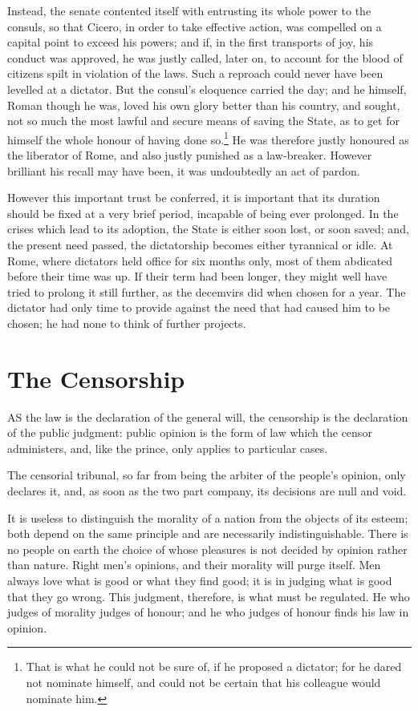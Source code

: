 \documentclass[12pt]{book}
\begin{document}
Instead, the senate contented itself with entrusting its whole power to the consuls, so that Cicero, in order to take effective action, was compelled on a capital point to exceed his powers; and if, in the first transports of joy, his conduct was approved, he was justly called, later on, to account for the blood of citizens spilt in violation of the laws. Such a reproach could never have been levelled at a dictator. But the consul's eloquence carried the day; and he himself, Roman though he was, loved his own glory better than his country, and sought, not so much the most lawful and secure means of saving the State, as to get for himself the whole honour of having done so.\footnote{That is what he could not be sure of, if he proposed a dictator; for he dared not nominate himself, and could not be certain that his colleague would nominate him.} He was therefore justly honoured as the liberator of Rome, and also justly punished as a law-breaker. However brilliant his recall may have been, it was undoubtedly an act of pardon.

However this important trust be conferred, it is important that its duration should be fixed at a very brief period, incapable of being ever prolonged. In the crises which lead to its adoption, the State is either soon lost, or soon saved; and, the present need passed, the dictatorship becomes either tyrannical or idle. At Rome, where dictators held office for six months only, most of them abdicated before their time was up. If their term had been longer, they might well have tried to prolong it still further, as the decemvirs did when chosen for a year. The dictator had only time to provide against the need that had caused him to be chosen; he had none to think of further projects.

\section{The Censorship}
AS the law is the declaration of the general will, the censorship is the declaration of the public judgment: public opinion is the form of law which the censor administers, and, like the prince, only applies to particular cases.

The censorial tribunal, so far from being the arbiter of the people's opinion, only declares it, and, as soon as the two part company, its decisions are null and void.

It is useless to distinguish the morality of a nation from the objects of its esteem; both depend on the same principle and are necessarily indistinguishable. There is no people on earth the choice of whose pleasures is not decided by opinion rather than nature. Right men's opinions, and their morality will purge itself. Men always love what is good or what they find good; it is in judging what is good that they go wrong. This judgment, therefore, is what must be regulated. He who judges of morality judges of honour; and he who judges of honour finds his law in opinion.
\end{document}
